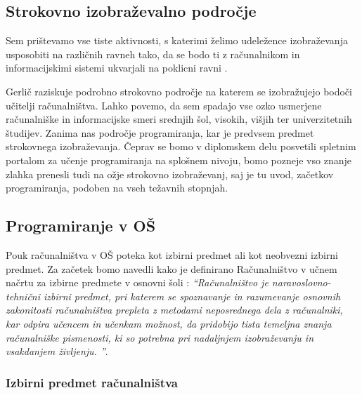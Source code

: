 
\subsection{Strokovno izobraževalno področje}
\label{sec:strokovno_izo_področje}


Sem prištevamo vse tiste aktivnosti, s katerimi želimo udeležence
izobraževanja usposobiti na različnih ravneh tako, da se bodo ti z
računalnikom in informacijskimi sistemi ukvarjali na poklicni ravni
\cite{gerlic_2000}.

Gerlič raziskuje podrobno strokovno področje na katerem se
izobražujejo bodoči učitelji računalništva. Lahko povemo, da sem
spadajo vse ozko usmerjene računalniške in informacijske smeri srednjih
šol, visokih, višjih ter univerzitetnih študijev. Zanima nas področje
programiranja, kar je predvsem predmet strokovnega
izobraževanja. Čeprav se bomo v diplomskem delu posvetili spletnim
portalom za učenje programiranja na splošnem nivoju, bomo pozneje vso
znanje zlahka prenesli tudi na ožje strokovno izobraževanj, saj je tu
uvod, začetkov programiranja, podoben na vseh težavnih stopnjah.

\subsection{Programiranje v OŠ}
\label{sec:Programiranje_v_OŠ}

Pouk računalništva v OŠ poteka kot izbirni predmet ali kot neobvezni
izbirni predmet. Za začetek bomo navedli kako je definirano
Računalništvo v učnem načrtu za izbirne predmete v osnovni šoli
\cite{ucni_nacrt-izbirni-os}:
\emph{``Računalništvo je
  naravoslovno-tehnični izbirni predmet, pri katerem se spoznavanje in
  razumevanje osnovnih zakonitosti računalništva prepleta z metodami
  neposrednega dela z računalniki, kar odpira učencem in učenkam
  možnost, da pridobijo tista temeljna znanja računalniške pismenosti,
  ki so potrebna pri nadaljnjem izobraževanju in vsakdanjem življenju.
  ''}.

\subsubsection{Izbirni predmet računalništva}
\label{sec:izbirni_predmet_rac}

